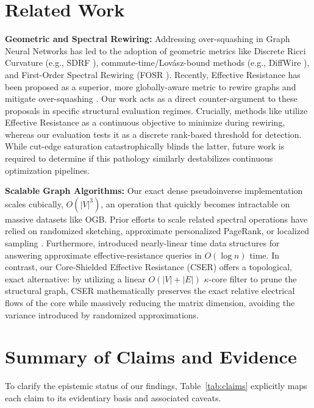 \documentclass[10pt]{article} %
\begin{document}
\section{Related Work}
\label{sec:related}
\textbf{Geometric and Spectral Rewiring:} Addressing over-squashing in Graph Neural Networks has led to the adoption of geometric metrics like Discrete Ricci Curvature (e.g., SDRF \citep{Topping2022}), commute-time/Lovász-bound methods (e.g., DiffWire \citep{DiffWire}), and First-Order Spectral Rewiring (FOSR \citep{Karhadkar2023}). Recently, Effective Resistance has been proposed as a superior, more globally-aware metric to rewire graphs and mitigate over-squashing \citep{Black2023}. Our work acts as a direct counter-argument to these proposals in specific structural evaluation regimes. Crucially, methods like \citet{Black2023} utilize Effective Resistance as a continuous objective to minimize during rewiring, whereas our evaluation tests it as a discrete rank-based threshold for detection. While cut-edge saturation catastrophically blinds the latter, future work is required to determine if this pathology similarly destabilizes continuous optimization pipelines.

\textbf{Scalable Graph Algorithms:} Our exact dense pseudoinverse implementation scales cubically, $O(|V|^3)$, an operation that quickly becomes intractable on massive datasets like OGB. Prior efforts to scale related spectral operations have relied on randomized sketching, approximate personalized PageRank, or localized sampling \citep{Spielman2004}. Furthermore, \citet{SpielmanSrivastava} introduced nearly-linear time data structures for answering approximate effective-resistance queries in $O(\log n)$ time. In contrast, our Core-Shielded Effective Resistance (CSER) offers a topological, exact alternative: by utilizing a linear $O(|V|+|E|)$ $\kappa$-core filter to prune the structural graph, CSER mathematically preserves the exact relative electrical flows of the core while massively reducing the matrix dimension, avoiding the variance introduced by randomized approximations.

\section{Summary of Claims and Evidence}
To clarify the epistemic status of our findings, Table~\ref{tab:claims} explicitly maps each claim to its evidentiary basis and associated caveats.
\end{document}
